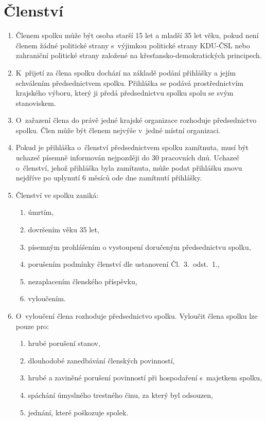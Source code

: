 \documentclass[a4paper]{article}
\begin{document}
\section{Členství}
    \begin{enumerate}
    \item Členem spolku může být osoba starší 15 let a mladší 35 let věku,
        pokud není členem žádné politické strany s~výjimkou politické strany
        KDU-ČSL nebo zahraniční politické strany založené na
        křesťansko-demokratických principech.

    \item K~přijetí za člena spolku dochází na základě podání přihlášky a
        jejím schválením předsednictvem spolku. Přihláška se podává
        prostřednictvím krajského výboru, který ji předá předsednictvu
        spolku spolu se svým stanoviskem.

    \item O~zařazení člena do právě jedné krajské organizace rozhoduje
        předsednictvo spolku. Člen může být členem nejvýše v~jedné místní
        organizaci.

    \item Pokud je přihláška o~členství předsednictvem spolku zamítnuta,
        musí být uchazeč písemně informován nejpozději do 30 pracovních dnů.
        Uchazeč o~členství, jehož přihláška byla zamítnuta, může podat
        přihlášku znovu nejdříve po uplynutí 6 měsíců ode dne zamítnutí
        přihlášky.

    \item Členství ve spolku zaniká:
        \begin{enumerate}
        \item úmrtím,
        \item dovršením věku 35 let,
        \item písemným prohlášením o vystoupení doručeným předsednictvu
            spolku,
        \item porušením podmínky členství dle ustanovení Čl.~3.~odst.~1.,
        \item nezaplacením členského příspěvku,
        \item vyloučením.
        \end{enumerate}


    \item O~vyloučení člena rozhoduje předsednictvo spolku. Vyloučit člena
        spolku lze pouze pro:
        \begin{enumerate}
        \item hrubé porušení stanov,
        \item dlouhodobé zanedbávání členských povinností,
        \item hrubé a zaviněné porušení povinností při hospodaření s~majetkem
            spolku,
        \item spáchání úmyslného trestného činu, za který byl odsouzen,
        \item jednání, které poškozuje spolek.
        \end{enumerate}


\end{enumerate}
\end{document}
